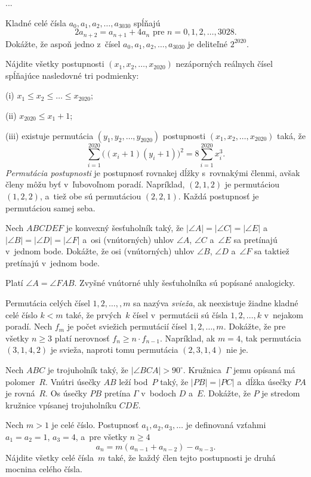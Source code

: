 {%
...}

{%
Kladné celé čísla $a_0,a_1,a_2,\dots,a_{3030}$ spĺňajú
$$
2a_{n+2} = a_{n+1} + 4a_n \text{\ \ pre $n=0,1,2,\dots,3028$.}
$$
Dokážte, že aspoň jedno z~čísel $a_0,a_1,a_2,\dots,a_{3030}$ je deliteľné $2^{2020}$.}

{%
Nájdite všetky postupnosti $(x_1,x_2,\dots,x_{2020})$ nezáporných reálnych čísel spĺňajúce nasledovné tri podmienky:
\item{(i)} $x_1 \leq x_2 \leq \dots \leq x_{2020}$;
\item{(ii)} $x_{2020} \le x_1 + 1$;
\item{(iii)} existuje permutácia $(y_1,y_2,\dots,y_{2020})$ postupnosti $(x_1,x_2,\dots,x_{2020})$ taká, že
$$
\sum_{i=1}^{2020} \big((x_i+1)(y_i+1)\big)^2 = 8 \sum_{i=1}^{2020} x_i^3.
$$
\endgraf\noindent
\emph{Permutácia postupnosti} je postupnosť rovnakej dĺžky s~rovnakými členmi, avšak členy môžu byť v~ľubovoľnom poradí. Napríklad, $(2,1,2)$ je permutáciou $(1,2,2)$, a~tiež obe sú permutáciou $(2,2,1)$. Každá postupnosť je permutáciou samej seba.}

{%
Nech $ABCDEF$ je konvexný šesťuholník taký, že $|\angle A| = |\angle C| = |\angle E|$ a~$|\angle B| = |\angle D| = |\angle F|$ a~osi (vnútorných) uhlov $\angle A$, $\angle C$ a~$\angle E$ sa pretínajú v~jednom bode. Dokážte, že osi (vnútorných) uhlov $\angle B$, $\angle D$ a~$\angle F$ sa taktiež pretínajú v~jednom bode.

\poznamka
Platí $\angle A = \angle FAB$. Zvyšné vnútorné uhly šesťuholníka sú popísané analogicky.}

{%
Permutácia celých čísel $1,2,\dots,,m$ sa nazýva \emph{svieža}, ak neexistuje žiadne kladné celé číslo $k < m$ také, že prvých~$k$ čísel v~permutácii sú čísla $1,2,\dots,k$ v~nejakom poradí. Nech $f_m$ je počet sviežich permutácií čísel $1,2,\dots,m$.
Dokážte, že pre všetky $n \ge 3$ platí nerovnosť $f_{n} \ge n \cdot f_{n-1}$.
\poznamka
Napríklad, ak $m=4$, tak permutácia $(3,1,4,2)$ je svieža, naproti tomu permutácia $(2,3,1,4)$ nie je.}

{%
Nech $ABC$ je trojuholník taký, že $|\angle BCA|>90^\circ$. Kružnica~$\Gamma$ jemu opísaná má polomer~$R$. Vnútri úsečky $AB$ leží bod~$P$ taký, že $|PB|=|PC|$ a~dĺžka úsečky $PA$ je rovná~$R$. Os úsečky $PB$ pretína $\Gamma$ v~bodoch $D$ a~$E$.
Dokážte, že $P$ je stredom kružnice vpísanej trojuholníku $CDE$. }

{%
Nech $m>1$ je celé číslo. Postupnosť $a_1, a_2, a_3, \dots$ je definovaná vzťahmi $a_1=a_2=1$, $a_3=4$, a~pre všetky $n \ge 4$
$$
a_n = m(a_{n-1} + a_{n-2}) - a_{n-3}.
$$
Nájdite všetky celé čísla~$m$ také, že každý člen tejto postupnosti je druhá mocnina celého čísla.
}
